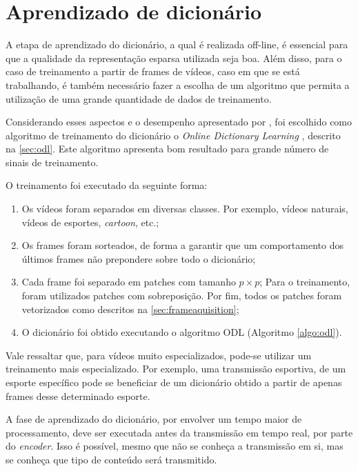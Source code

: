 \documentclass[cic,tc]{iiufrgs}
\begin{document}
\section{Aprendizado de dicionário}
\label{sec:learn}
A etapa de aprendizado do dicionário, a qual é realizada off-line, é essencial para que a qualidade da representação
esparsa utilizada seja boa.
Além disso, para o caso de treinamento a partir de frames de vídeos, caso em que se está
trabalhando, é também necessário fazer a escolha de um algoritmo que permita a utilização
de uma grande quantidade de dados de treinamento.

Considerando esses aspectos e o desempenho apresentado por \citet{MairalOnlineDictLearn}, foi escolhido
como algoritmo de treinamento do dicionário o \textit{Online Dictionary Learning} \cite{MairalOnlineDictLearn},
descrito na \autoref{sec:odl}.
Este algoritmo apresenta bom resultado para grande número de sinais de treinamento.

O treinamento foi executado da seguinte forma:
\begin{enumerate}
    \item Os vídeos foram separados em diversas classes. Por exemplo, vídeos naturais, vídeos
    de esportes, \textit{cartoon}, etc.;
    \item Os frames foram sorteados, de forma a garantir que um comportamento dos últimos frames
    não prepondere sobre todo o dicionário;
    \item Cada frame foi separado em patches com tamanho $p \times p$;
    Para o treinamento, foram utilizados patches com sobreposição. Por fim, todos os patches
    foram vetorizados como descritos na \autoref{sec:frameaquisition};
    \item O dicionário foi obtido executando o algoritmo ODL (Algoritmo \ref{algo:odl}).
\end{enumerate}

Vale ressaltar que, para vídeos muito especializados, pode-se utilizar um treinamento
mais especializado. 
Por exemplo, uma transmissão esportiva, de um esporte específico pode se beneficiar 
de um dicionário obtido a partir de apenas frames desse determinado esporte.

A fase de aprendizado do dicionário, por envolver um tempo maior de processamento,
deve ser executada antes da transmissão em tempo real, por parte do \textit{encoder}.
Isso é possível, mesmo que não
se conheça a transmissão em si, mas se conheça que tipo de conteúdo será transmitido.
\end{document}
